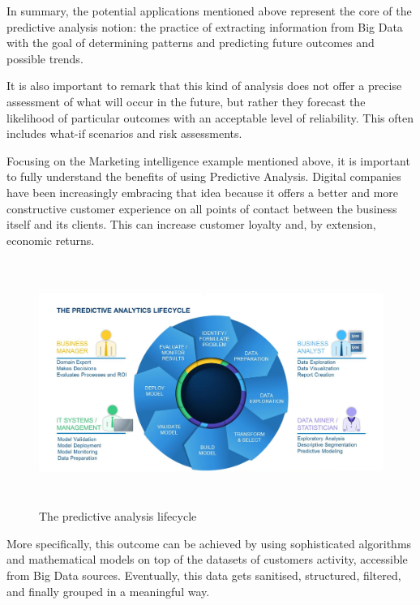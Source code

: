 In summary, the potential applications mentioned above represent the core of the predictive analysis notion: the practice of extracting information from Big Data with the goal of determining patterns and predicting future outcomes and possible trends. 

It is also important to remark that this kind of analysis does not offer a precise assessment of what will occur in the future, but rather they forecast the likelihood of particular outcomes with an acceptable level of reliability. This often includes what-if scenarios and risk assessments.

Focusing on the Marketing intelligence example mentioned above, it is important to fully understand the benefits of using Predictive Analysis. Digital companies have been increasingly embracing that idea because it offers a better and more constructive customer experience on all points of contact between the business itself and its clients. This can increase customer loyalty and, by extension, economic returns.

\vspace{0.5cm}
\begin{figure}[htbp]
  \centering
    \includegraphics[height=8cm]{images/pa-lifecycle.jpg}
  \caption{The predictive analysis lifecycle }
  \label{fig:predictive-analysis}
\end{figure}
\vspace{0.5cm}

\pagebreak

More specifically, this outcome can be achieved by using sophisticated algorithms and mathematical models on top of the datasets of customers activity, accessible from Big Data sources. Eventually, this data gets sanitised, structured, filtered, and finally grouped in a meaningful way. 


